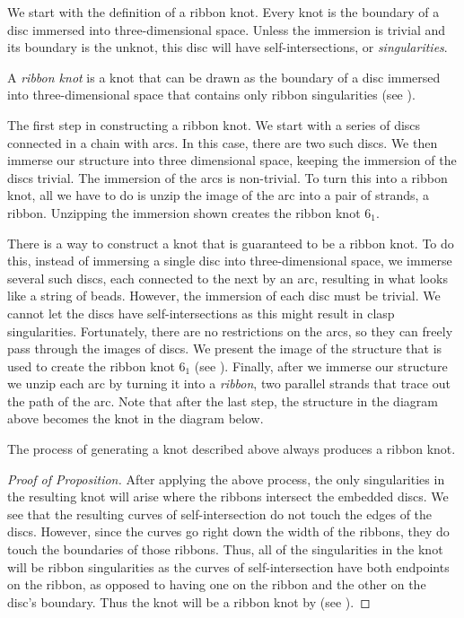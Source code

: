 \begin{paper}
We start with the definition of a ribbon knot.
Every knot is the boundary of a disc immersed into three-dimensional space.
Unless the immersion is trivial and its boundary is the unknot, this disc will
have self-intersections, or \textit{singularities}.

{A \textit{ribbon knot} is a knot that can be drawn as the boundary of a disc
immersed into three-dimensional space that contains only ribbon singularities
(see \figSingularities).}

{The first step in constructing a ribbon knot.
We start with a series of discs connected in a chain with arcs.
In this case, there are two such discs.
We then immerse our structure into three dimensional space, keeping the
immersion of the discs trivial.
The immersion of the arcs is non-trivial.
To turn this into a ribbon knot, all we have to do is unzip the image of the
arc into a pair of strands, a ribbon.
Unzipping the immersion shown creates the ribbon knot $6_1$.}

There is a way to construct a knot that is guaranteed to be a ribbon knot.
To do this, instead of immersing a single disc into three-dimensional space, we
immerse several such discs, each connected to the next by an arc, resulting in
what looks like a string of beads.
However, the immersion of each disc must be trivial.
We cannot let the discs have self-intersections as this might result in clasp
singularities.
Fortunately, there are no restrictions on the arcs, so they can freely pass
through the images of discs.
We present the image of the structure that is used to create the ribbon knot
$6_1$ (see \figImmersion).
Finally, after we immerse our structure we unzip each arc by turning it into a
\textit{ribbon}, two parallel strands that trace out the path of the arc.
Note that after the last step, the structure in the diagram above becomes the
knot in the diagram below.

{The process of generating a knot described above always produces a ribbon
knot.}
\begin{proof}[Proof of Proposition]
After applying the above process, the only singularities in the resulting knot
will arise where the ribbons intersect the embedded discs.
We see that the resulting curves of self-intersection do not touch the edges of
the discs.
However, since the curves go right down the width of the ribbons, they do touch
the boundaries of those ribbons.
Thus, all of the singularities in the knot will be ribbon singularities as the
curves of self-intersection have both endpoints on the ribbon, as opposed to
having one on the ribbon and the other on the disc's boundary.
Thus the knot will be a ribbon knot by  (see \figSingularities).
\end{proof}


\end{paper}
